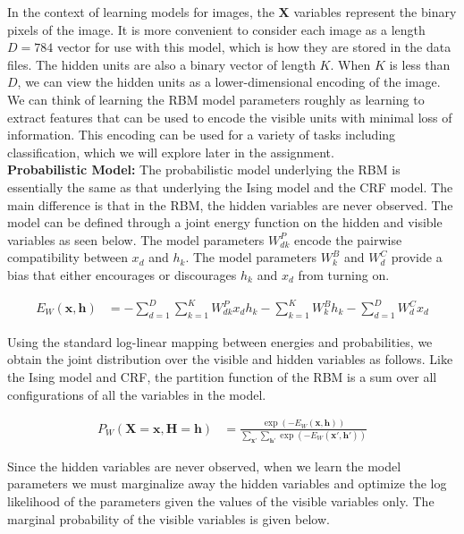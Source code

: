 \documentclass[11pt]{article}
\newcommand{\mbf}[1]{{\mathbf{#1}}}
\begin{document}
In the context of learning models for images, the $\mbf{X}$ variables represent the binary pixels of the image. It is more convenient to consider each image as a length $D=784$ vector for use with this model, which is how they are stored in the data files. The hidden units are also a binary vector of length $K$. When $K$ is less than $D$, we can view the hidden units as a lower-dimensional encoding of the image. We can think of learning the RBM model parameters roughly as learning to extract features that can be used to encode the visible units with minimal loss of information. This encoding can be used for a variety of tasks including classification, which we will explore later in the assignment.\\

\textbf{Probabilistic Model:} The probabilistic model underlying the RBM is essentially the same as that underlying the Ising model and the CRF model. The main difference is that in the RBM, the hidden variables are never observed. The model can be defined through a joint energy function on the hidden and visible variables as seen below. The model parameters $W^P_{dk}$ encode the
pairwise compatibility between $x_d$ and $h_k$. The model parameters $W^B_k$ and $W^C_d$
provide a bias that either encourages or discourages $h_k$ and $x_d$ from turning on.

\begin{align}
\label{energy}
E_W(\mbf{x},\mbf{h})&=
-\sum_{d=1}^D\sum_{k=1}^K W^P_{dk}x_dh_k - \sum_{k=1}^KW^B_k h_k - \sum_{d=1}^D W^C_d x_d
\end{align}

Using the standard log-linear mapping between energies and probabilities, we obtain the joint distribution over the visible and hidden variables as follows. Like the Ising model and CRF, the partition function of the RBM is a sum over all configurations of all the variables in the model.

\begin{align}
\label{joint-prob}
P_W(\mbf{X}=\mbf{x},\mbf{H}=\mbf{h})&= \frac{\exp(-E_W(\mbf{x},\mbf{h}))}
{\sum_{\mbf{x}'}\sum_{\mbf{h}'}\exp(-E_W(\mbf{x}',\mbf{h}'))}
\end{align}

Since the hidden variables are never observed, when we learn the model parameters we must marginalize away the hidden variables and optimize the log likelihood of the parameters given the values of the visible variables only. The marginal probability of the visible variables is given below.
\end{document}
